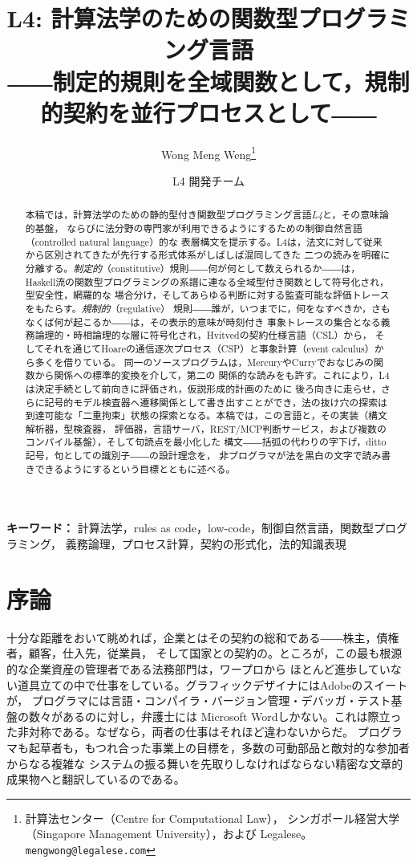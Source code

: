 \documentclass[11pt,a4paper]{ltjsarticle}
\title{\bfseries L4: 計算法学のための関数型プログラミング言語\\[2pt]
\large ――制定的規則を全域関数として，規制的契約を並行プロセスとして――}
\author{Wong Meng Weng\thanks{計算法センター（Centre for Computational Law），
シンガポール経営大学（Singapore Management University），および Legalese。
\texttt{mengwong@legalese.com}}
\and L4 開発チーム}
\date{}
\begin{document}
\maketitle

\begin{abstract}
本稿では，計算法学のための静的型付き関数型プログラミング言語\emph{L4}と，その意味論的基盤，
ならびに法分野の専門家が利用できるようにするための制御自然言語（controlled natural language）的な
表層構文を提示する。L4は，法文に対して従来から区別されてきたが先行する形式体系がしばしば混同してきた
二つの読みを明確に分離する。\emph{制定的}（constitutive）規則――何が何として数えられるか――は，
Haskell流の関数型プログラミングの系譜に連なる全域型付き関数として符号化され，型安全性，網羅的な
場合分け，そしてあらゆる判断に対する監査可能な評価トレースをもたらす。\emph{規制的}（regulative）
規則――誰が，いつまでに，何をなすべきか，さもなくば何が起こるか――は，その表示的意味が時刻付き
事象トレースの集合となる義務論理的・時相論理的な層に符号化され，Hvitvedの契約仕様言語（CSL）から，
そしてそれを通じてHoareの通信逐次プロセス（CSP）と事象計算（event calculus）から多くを借りている。
同一のソースプログラムは，MercuryやCurryでおなじみの関数から関係への標準的変換を介して，第二の
関係的な読みをも許す。これにより，L4は決定手続として前向きに評価され，仮説形成的計画のために
後ろ向きに走らせ，さらに記号的モデル検査器へ遷移関係として書き出すことができ，法の抜け穴の探索は
到達可能な「二重拘束」状態の探索となる。本稿では，この言語と，その実装（構文解析器，型検査器，
評価器，言語サーバ，REST/MCP判断サービス，および複数のコンパイル基盤），そして句読点を最小化した
構文――括弧の代わりの字下げ，ditto記号，句としての識別子――の設計理念を，
非プログラマが法を黒白の文字で読み書きできるようにするという目標とともに述べる。
\end{abstract}

\noindent\textbf{キーワード：} 計算法学，rules as code，low-code，制御自然言語，関数型プログラミング，
義務論理，プロセス計算，契約の形式化，法的知識表現

\section{序論}
十分な距離をおいて眺めれば，企業とはその契約の総和である――株主，債権者，顧客，仕入先，従業員，
そして国家との契約の。ところが，この最も根源的な企業資産の管理者である法務部門は，ワープロから
ほとんど進歩していない道具立ての中で仕事をしている。グラフィックデザイナにはAdobeのスイートが，
プログラマには言語・コンパイラ・バージョン管理・デバッガ・テスト基盤の数々があるのに対し，弁護士には
Microsoft Wordしかない。これは際立った非対称である。なぜなら，両者の仕事はそれほど違わないからだ。
プログラマも起草者も，もつれ合った事業上の目標を，多数の可動部品と敵対的な参加者からなる複雑な
システムの振る舞いを先取りしなければならない精密な文章的成果物へと翻訳しているのである。
\end{document}
